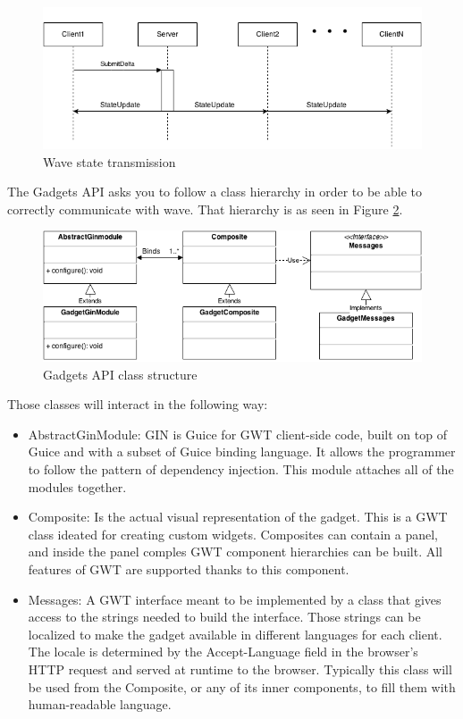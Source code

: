 \begin{figure}[h]
  \center
    \includegraphics[keepaspectratio, scale=0.6]{Media/Diagrams/Wave/StateSequence.png}
  \caption{Wave state transmission}
  \label{fig:wave_state}
\end{figure}
The Gadgets API asks you to follow a class hierarchy in order to be able to correctly communicate with wave. That hierarchy is as seen in Figure \ref{fig:gadget_classes}.\\[.2cm]
\begin{figure}[h]
  \center
    \includegraphics[keepaspectratio, scale=0.5]{Media/Diagrams/Gadget/Gadget.png}
  \caption{Gadgets API class structure}
  \label{fig:gadget_classes}
\end{figure}
Those classes will interact in the following way:
\begin{itemize}
  \item AbstractGinModule: GIN is Guice for GWT client-side code, built on top of Guice and with a subset of Guice binding language. It allows the programmer to follow the pattern of dependency injection. This module attaches all of the modules together.
  \item Composite: Is the actual visual representation of the gadget. This is a GWT class ideated for creating custom widgets. Composites can contain a panel, and inside the panel comples GWT component hierarchies can be built. All features of GWT are supported thanks to this component.
  \item Messages: A GWT interface meant to be implemented by a class that gives access to the strings needed to build the interface. Those strings can be localized to make the gadget available in different languages for each client. The locale is determined by the Accept-Language field in the browser's HTTP request \cite{ref:gwt_internationalization} and served at runtime to the browser. Typically this class will be used from the Composite, or any of its inner components, to fill them with human-readable language.
\end{itemize}
